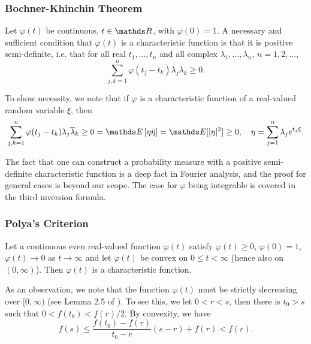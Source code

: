 \subsubsection{Bochner-Khinchin Theorem}
\begin{theorem}
Let $\varphi(t)$ be continuous, $t\in \R$, with $\varphi(0) = 1$. A necessary and sufficient condition that $\varphi(t)$ is a characteristic function is that it is positive semi-definite, i.e. that for all real $t_1, \dots, t_n$ and all complex $\lambda_1, \dots, \lambda_n$, $n=1,2,\dots$,
\begin{equation*}
    \sum_{j,k = 1}^n \varphi(t_j - t_k)\lambda_j \overline{\lambda}_k \ge 0.
\end{equation*}
\end{theorem}

To show necessity, we note that if $\varphi$ is a characteristic function of a real-valued random variable $\xi$, then 
\begin{equation*}
    \sum_{j,k = 1}^n \varphi(t_j - t_k)\lambda_j \overline{\lambda}_k \ge 0 = \E\sqbracket{\eta\bar{\eta}} = \E[|\eta|^2] \geq 0, \quad \eta = \sum_{j=1}^n \lambda_j e^{t_j \xi}. 
\end{equation*}

The fact that one can construct a probability measure with a positive semi-definite characteristic function is a deep fact in Fourier analysis, and the proof for general cases is beyond our scope. The case for $\varphi$ being integrable is covered in the third inversion formula.

\subsubsection{Polya's Criterion}
\begin{theorem}
Let a continuous even real-valued function $\varphi(t)$ satisfy $\varphi(t) \ge 0$, $\varphi(0) = 1$, $\varphi(t) \to 0$ as $t \to \infty$ and let $\varphi(t)$ be convex on $0 \le t < \infty$ (hence also on $(0, \infty)$). Then $\varphi(t)$ is a characteristic function.
\end{theorem}

As an observation, we note that the function $\varphi(t)$ must be strictly decreasing over $[0,\infty)$ (see Lemma 2.5 of \cite{convex_decay}). To see this, we let $0<r<s$, then there is $t_0 > s$ such that $0<f(t_0)<f(r)/2$. By convexity, we have
\begin{equation*}
    f(s) \leq \frac{f(t_0) - f(r)}{t_0 - r} (s - r) + f(r) < f(r).
\end{equation*}

